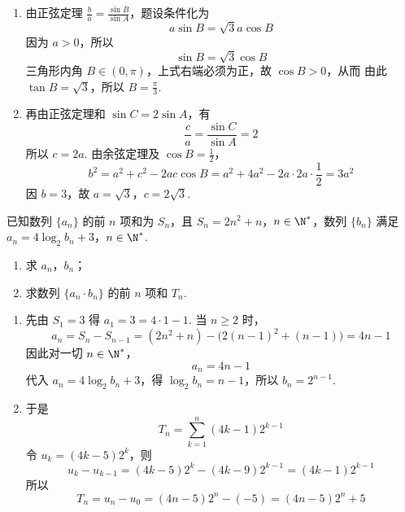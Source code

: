 \begin{solution}
\begin{enumerate}
\item 由正弦定理 \(\frac{b}{a}=\frac{\sin B}{\sin A}\)，题设条件化为
\[
a\sin B=\sqrt3a\cos B
\]
因为 \(a>0\)，所以
\[
\sin B=\sqrt3\cos B
\]
三角形内角 \(B\in(0,\pi)\)，上式右端必须为正，故 \(\cos B>0\)，从而
由此 \(\tan B=\sqrt3\)，所以 \(B=\frac{\pi}{3}\).

\item 再由正弦定理和 \(\sin C=2\sin A\)，有
\[
\frac ca=\frac{\sin C}{\sin A}=2
\]
所以 \(c=2a\). 由余弦定理及 \(\cos B=\frac{1}{2}\)，
\[
b^2=a^2+c^2-2ac\cos B
=a^2+4a^2-2a\cdot2a\cdot\frac12=3a^2
\]
因 \(b=3\)，故 \(a=\sqrt3\)，\(c=2\sqrt3\).
\end{enumerate}
\end{solution}

\begin{problem}
已知数列 \(\{a_{n}\}\) 的前 \(n\) 项和为 \(S_{n}\)，且 \(S_{n} = 2n^{2} + n\)，\(n \in \N^{*}\)，数列 \(\{b_{n}\}\) 满足 \(a_{n} = 4\log_{2}b_{n} + 3\)，\(n \in \N^{*}\).

\begin{enumerate}
\item 求 \(a_{n}\)，\(b_{n}\)；
\item 求数列 \(\{a_{n} \cdot b_{n}\}\) 的前 \(n\) 项和 \(T_{n}\).
\end{enumerate}
\end{problem}

\begin{solution}
\begin{enumerate}
\item 先由 \(S_1=3\) 得 \(a_1=3=4\cdot1-1\). 当 \(n\geqslant2\) 时，
\[
a_n=S_n-S_{n-1}
=(2n^2+n)-\bigl(2(n-1)^2+(n-1)\bigr)=4n-1
\]
因此对一切 \(n\in\N^*\)，
\[
a_n=4n-1
\]
代入 \(a_n=4\log_2b_n+3\)，得
\(\log_2b_n=n-1\)，所以 \(b_n=2^{n-1}\).

\item 于是
\[
T_n=\sum_{k=1}^n(4k-1)2^{k-1}
\]
令 \(u_k=(4k-5)2^k\)，则
\[
u_k-u_{k-1}
=(4k-5)2^k-(4k-9)2^{k-1}
=(4k-1)2^{k-1}
\]
所以
\[
T_n=u_n-u_0=(4n-5)2^n-(-5)=(4n-5)2^n+5
\]
\end{enumerate}
\end{solution}

